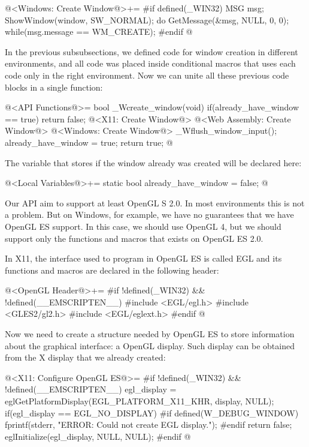 \iniciocodigo
@<Windows: Create Window@>+=
#if defined(_WIN32)
{
  MSG msg;
  ShowWindow(window, SW_NORMAL);
  do{
    GetMessage(&msg, NULL, 0, 0);
  } while(msg.message == WM_CREATE);
}
#endif
@
\fimcodigo


In the previous subsubsections, we defined code for window creation in
different environments, and all code was placed inside conditional
macros that uses each code only in the right environment. Now we can
unite all these previous code blocks in a single function:

\iniciocodigo
@<API Functions@>=
bool _Wcreate_window(void){
  if(already_have_window == true)
    return false;
  @<X11: Create Window@>
  @<Web Assembly: Create Window@>
  @<Windows: Create Window@>
  _Wflush_window_input();
  already_have_window = true;
  return true;
}
@
\fimcodigo

The variable that stores if the window already was created will be
declared here:

\iniciocodigo
@<Local Variables@>+=
static bool already_have_window = false;
@
\fimcodigo


Our API aim to support at least OpenGL S 2.0. In most environments
this is not a problem. But on Windows, for example, we have no
guarantees that we have OpenGL ES support. In this case, we should use
OpenGL 4, but we should support only the functions and macros that
exists on OpenGL ES 2.0.


In X11, the interface used to program in OpenGL ES is called EGL and
its functions and macros are declared in the following header:

\iniciocodigo
@<OpenGL Header@>+=
#if !defined(_WIN32) && !defined(__EMSCRIPTEN__)
#include <EGL/egl.h>
#include <GLES2/gl2.h>
#include <EGL/eglext.h>
#endif
@
\fimcodigo

Now we need to create a structure needed by OpenGL ES to store
information about the graphical interface: a OpenGL display. Such
display can be obtained from the X display that we already created:

\iniciocodigo
@<X11: Configure OpenGL ES@>=
#if !defined(_WIN32) && !defined(__EMSCRIPTEN__)
egl_display = eglGetPlatformDisplay(EGL_PLATFORM_X11_KHR, display,
                                    NULL);
if(egl_display == EGL_NO_DISPLAY){
#if defined(W_DEBUG_WINDOW)
  fprintf(stderr, "ERROR: Could not create EGL display.\n");
#endif
  return false;
}
eglInitialize(egl_display, NULL, NULL);
#endif
@
\fimcodigo

